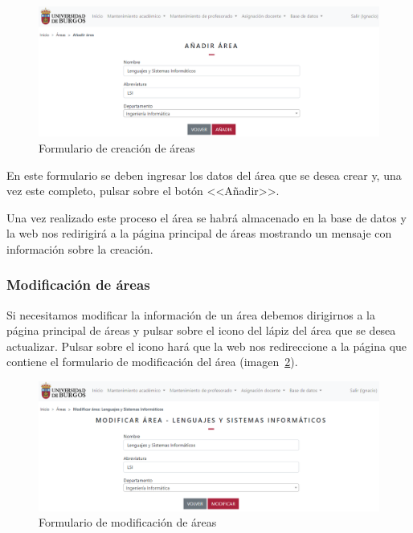 \begin{figure}
	\centering
	\includegraphics[width=\textwidth]{../img/Anexos/Manual usuario/formArea.png}
	\caption{Formulario de creación de áreas}\label{pag:formArea}
\end{figure}

En este formulario se deben ingresar los datos del área que se desea crear y, una vez este completo, pulsar sobre el botón <<Añadir>>.

Una vez realizado este proceso el área se habrá almacenado en la base de datos y la web nos redirigirá a la página principal de áreas mostrando un mensaje con información sobre la creación.

\subsubsection{Modificación de áreas}
Si necesitamos modificar la información de un área debemos dirigirnos a la página principal de áreas y pulsar sobre el icono del lápiz del área que se desea actualizar.
Pulsar sobre el icono hará que la web nos redireccione a la página que contiene el formulario de modificación del área (imagen~\ref{pag:formModArea}).

\begin{figure}
	\centering
	\includegraphics[width=\textwidth]{../img/Anexos/Manual usuario/formModArea.png}
	\caption{Formulario de modificación de áreas}\label{pag:formModArea}
\end{figure}

